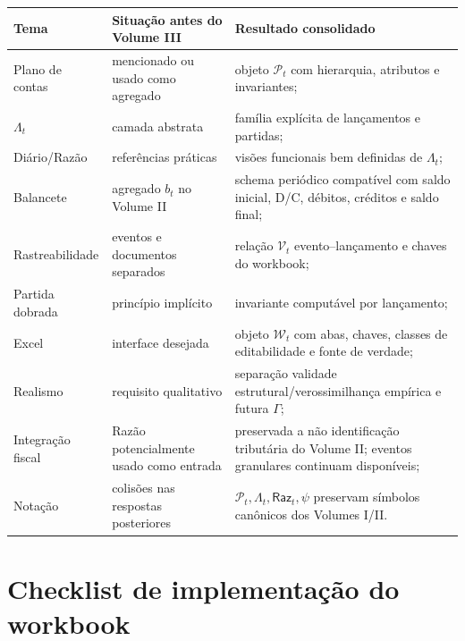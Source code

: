 \documentclass[11pt,a4paper]{article}
\newcommand{\Plano}{\mathcal{P}}
\newcommand{\Raz}{\mathsf{Raz}}
\newcommand{\Wb}{\mathcal{W}}
\begin{document}
\begin{longtable}{p{} p{} p{}}
\toprule
\textbf{Tema} & \textbf{Situação antes do Volume III} & \textbf{Resultado consolidado}\\
\midrule
Plano de contas & mencionado ou usado como agregado & objeto $\Plano_t$ com hierarquia, atributos e invariantes;\\
$\Lambda_t$ & camada abstrata & família explícita de lançamentos e partidas;\\
Diário/Razão & referências práticas & visões funcionais bem definidas de $\Lambda_t$;\\
Balancete & agregado $b_t$ no Volume II & schema periódico compatível com saldo inicial, D/C, débitos, créditos e saldo final;\\
Rastreabilidade & eventos e documentos separados & relação $\mathcal V_t$ evento--lançamento e chaves do workbook;\\
Partida dobrada & princípio implícito & invariante computável por lançamento;\\
Excel & interface desejada & objeto $\Wb_t$ com abas, chaves, classes de editabilidade e fonte de verdade;\\
Realismo & requisito qualitativo & separação validade estrutural/verossimilhança empírica e futura $\Gamma$;\\
Integração fiscal & Razão potencialmente usado como entrada & preservada a não identificação tributária do Volume II; eventos granulares continuam disponíveis;\\
Notação & colisões nas respostas posteriores & $\Plano_t,\Lambda_t,\Raz_t,\psi$ preservam símbolos canônicos dos Volumes I/II.\\
\bottomrule
\end{longtable}

\section{Checklist de implementação do workbook}
\end{document}
